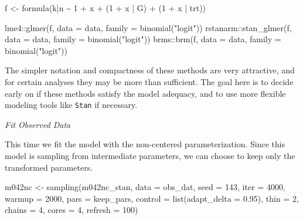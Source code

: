 \documentclass[11pt, oneside, openany]{scrbook}
\newenvironment{Shaded}{\begin{snugshade}}{\end{snugshade}}
\newcommand{\AttributeTok}[1]{\textcolor[rgb]{0.77,0.63,0.00}{#1}}
\newcommand{\DecValTok}[1]{\textcolor[rgb]{0.00,0.00,0.81}{#1}}
\newcommand{\FloatTok}[1]{\textcolor[rgb]{0.00,0.00,0.81}{#1}}
\newcommand{\FunctionTok}[1]{\textcolor[rgb]{0.00,0.00,0.00}{#1}}
\newcommand{\NormalTok}[1]{#1}
\newcommand{\OtherTok}[1]{\textcolor[rgb]{0.56,0.35,0.01}{#1}}
\newcommand{\SpecialCharTok}[1]{\textcolor[rgb]{0.00,0.00,0.00}{#1}}
\newcommand{\StringTok}[1]{\textcolor[rgb]{0.31,0.60,0.02}{#1}}
\begin{document}
\begin{Shaded}
\begin{Highlighting}[]
\NormalTok{f }\OtherTok{\textless{}{-}} \FunctionTok{formula}\NormalTok{(k}\SpecialCharTok{|}\NormalTok{n }\SpecialCharTok{\textasciitilde{}} \DecValTok{1} \SpecialCharTok{+}\NormalTok{ x }\SpecialCharTok{+}\NormalTok{ (}\DecValTok{1} \SpecialCharTok{+}\NormalTok{ x }\SpecialCharTok{|}\NormalTok{ G) }\SpecialCharTok{+}\NormalTok{ (}\DecValTok{1} \SpecialCharTok{+}\NormalTok{ x }\SpecialCharTok{|}\NormalTok{ trt))}

\NormalTok{lme4}\SpecialCharTok{::}\FunctionTok{glmer}\NormalTok{(f, }\AttributeTok{data =}\NormalTok{ data, }\AttributeTok{family =} \FunctionTok{binomial}\NormalTok{(}\StringTok{"logit"}\NormalTok{))}
\NormalTok{rstanarm}\SpecialCharTok{::}\FunctionTok{stan\_glmer}\NormalTok{(f, }\AttributeTok{data =}\NormalTok{ data, }\AttributeTok{family =} \FunctionTok{binomial}\NormalTok{(}\StringTok{"logit"}\NormalTok{))}
\NormalTok{brms}\SpecialCharTok{::}\FunctionTok{brm}\NormalTok{(f, }\AttributeTok{data =}\NormalTok{ data, }\AttributeTok{family =} \FunctionTok{binomial}\NormalTok{(}\StringTok{"logit"}\NormalTok{))}
\end{Highlighting}
\end{Shaded}


The simpler notation and compactness of these methods are very attractive, and for certain analyses they may be more than sufficient. The goal here is to decide early on if these methods satisfy the model adequacy, and to use more flexible modeling tools like \texttt{Stan} if necessary.

\emph{Fit Observed Data}

This time we fit the model with the non-centered parameterization. Since this model is sampling from intermediate parameters, we can choose to keep only the transformed parameters.


\begin{Shaded}
\begin{Highlighting}[]
\NormalTok{m042nc }\OtherTok{\textless{}{-}} \FunctionTok{sampling}\NormalTok{(m042nc\_stan, }\AttributeTok{data =}\NormalTok{ obs\_dat, }\AttributeTok{seed =} \DecValTok{143}\NormalTok{,}
                   \AttributeTok{iter =} \DecValTok{4000}\NormalTok{, }\AttributeTok{warmup =} \DecValTok{2000}\NormalTok{, }\AttributeTok{pars =}\NormalTok{ keep\_pars,}
                   \AttributeTok{control =} \FunctionTok{list}\NormalTok{(}\AttributeTok{adapt\_delta =} \FloatTok{0.95}\NormalTok{), }\AttributeTok{thin =} \DecValTok{2}\NormalTok{,}
                   \AttributeTok{chains =} \DecValTok{4}\NormalTok{, }\AttributeTok{cores =} \DecValTok{4}\NormalTok{, }\AttributeTok{refresh =} \DecValTok{100}\NormalTok{)}
\end{Highlighting}
\end{Shaded}
\end{document}
